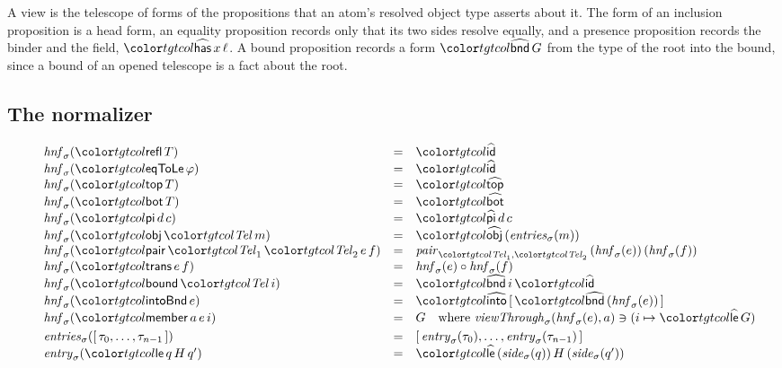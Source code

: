 A view is the telescope of forms of the propositions that an atom's resolved object type asserts about it. The form of an inclusion proposition is a head form, an equality proposition records only that its two sides resolve equally, and a presence proposition records the binder and the field, $\form{has}\,x\,\ell$. A bound proposition records a form $\form{bnd}\,G$ from the type of the root into the bound, since a bound of an opened telescope is a fact about the root.

\subsection{The normalizer}\label{sec:normalizer}

\begin{figure}
\small
\color{tgtcol}
\[
\begin{array}{@{}lcl@{}}
\mathit{hnf}_\sigma(\ev{refl}\,T) & = & \form{id} \\
\mathit{hnf}_\sigma(\ev{eqToLe}\,\varphi) & = & \form{id} \\
\mathit{hnf}_\sigma(\ev{top}\,T) & = & \form{top} \\
\mathit{hnf}_\sigma(\ev{bot}\,T) & = & \form{bot} \\
\mathit{hnf}_\sigma(\ev{pi}\,d\,c) & = & \form{pi}\,d\,c \\
\mathit{hnf}_\sigma(\ev{obj}\,\tel\,m) & = & \form{obj}\,(\mathit{entries}_\sigma(m)) \\
\mathit{hnf}_\sigma(\ev{pair}\,\tel_1\,\tel_2\,e\,f) & = & \mathit{pair}_{\tel_1,\tel_2}\,(\mathit{hnf}_\sigma(e))\,(\mathit{hnf}_\sigma(f)) \\
\mathit{hnf}_\sigma(\ev{trans}\,e\,f) & = & \mathit{hnf}_\sigma(e) \circ \mathit{hnf}_\sigma(f) \\
\mathit{hnf}_\sigma(\ev{bound}\,\tel\,i) & = & \form{bnd}\,i\,\form{id} \\
\mathit{hnf}_\sigma(\ev{intoBnd}\,e) & = & \form{into}\,[\,\form{bnd}\,(\mathit{hnf}_\sigma(e))\,] \\
\mathit{hnf}_\sigma(\ev{member}\,a\,e\,i) & = & G \quad \text{where } \mathit{viewThrough}_\sigma(\mathit{hnf}_\sigma(e), a) \ni (i \mapsto \form{le}\,G) \\[3pt]
\mathit{entries}_\sigma([\,\tau_0, \ldots, \tau_{n-1}\,]) & = & [\,\mathit{entry}_\sigma(\tau_0), \ldots, \mathit{entry}_\sigma(\tau_{n-1})\,] \\
\mathit{entry}_\sigma(\ev{le}\,q\,H\,q') & = & \form{le}\,(\mathit{side}_\sigma(q))\,H\,(\mathit{side}_\sigma(q')) \\

\end{array}\]
\end{figure}
